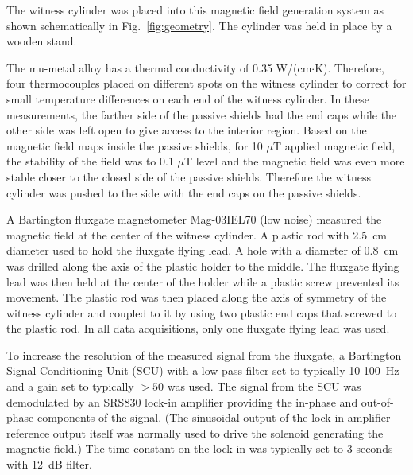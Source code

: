 The witness cylinder was placed into this magnetic field generation
system as shown schematically in Fig.~\ref{fig:geometry}.  The
cylinder was held in place by a wooden stand.


The mu-metal alloy has a thermal conductivity of 0.35
W/(cm$\cdot$K). Therefore, four thermocouples placed on different
spots on the witness cylinder to correct for small temperature
differences on each end of the witness cylinder.  In these
measurements, the farther side of the passive shields had the end caps
while the other side was left open to give access to the interior
region. Based on the magnetic field maps inside the passive shields,
for 10 $\mu$T applied magnetic field, the stability of the field was
to 0.1 $\mu$T level and the magnetic field was even more stable closer
to the closed side of the passive shields. Therefore the witness
cylinder was pushed to the side with the end caps on the passive
shields.


A Bartington fluxgate magnetometer Mag-03IEL70 (low noise) measured the
magnetic field at the center of the witness cylinder. A plastic rod with 2.5~cm diameter used to hold the fluxgate flying lead. A hole with a diameter of 0.8~cm was drilled along the axis of the plastic holder to the middle. The fluxgate flying lead was then held at the center of the holder while a plastic screw prevented its movement. The plastic rod was then placed along the axis of symmetry of the witness cylinder and coupled to it by using two plastic end caps that screwed to the plastic rod.
In all data acquisitions, only one fluxgate flying lead was used.





To increase the resolution of the measured signal from the fluxgate, a
Bartington Signal Conditioning Unit (SCU) with a low-pass filter set
to typically 10-100~Hz and a gain set to typically $>50$ was used.
The signal from the SCU was demodulated by an SRS830 lock-in amplifier
providing the in-phase and out-of-phase components of the signal.
(The sinusoidal output of the lock-in amplifier reference output
itself was normally used to drive the solenoid generating the magnetic
field.)  The time constant on the lock-in was typically set to 3
seconds with 12~dB filter.

